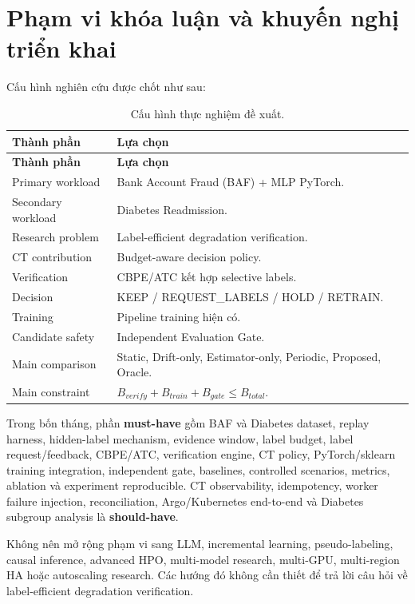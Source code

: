 \section{Phạm vi khóa luận và khuyến nghị triển khai}

Cấu hình nghiên cứu được chốt như sau:

\begin{longtable}{@{}L{4.2cm} L{\dimexpr\linewidth-4.2cm-2\tabcolsep\relax}@{}}
\caption{Cấu hình thực nghiệm đề xuất.}\label{tab:recommended-configuration}\\
\toprule\textbf{Thành phần} & \textbf{Lựa chọn}\\
\midrule\endfirsthead
\toprule\textbf{Thành phần} & \textbf{Lựa chọn}\\
\midrule\endhead
Primary workload & Bank Account Fraud (BAF) + MLP PyTorch.\\
Secondary workload & Diabetes Readmission.\\
Research problem & Label-efficient degradation verification.\\
CT contribution & Budget-aware decision policy.\\
Verification & CBPE/ATC kết hợp selective labels.\\
Decision & KEEP / REQUEST\_LABELS / HOLD / RETRAIN.\\
Training & Pipeline training hiện có.\\
Candidate safety & Independent Evaluation Gate.\\
Main comparison & Static, Drift-only, Estimator-only, Periodic, Proposed, Oracle.\\
Main constraint & \(\mathit{B}_{verify}+\mathit{B}_{train}+\mathit{B}_{gate}\leq\mathit{B}_{total}\).\\
\bottomrule
\end{longtable}

Trong bốn tháng, phần \textbf{must-have} gồm BAF và Diabetes dataset, replay harness, hidden-label mechanism, evidence window, label budget, label request/feedback, CBPE/ATC, verification engine, CT policy, PyTorch/sklearn training integration, independent gate, baselines, controlled scenarios, metrics, ablation và experiment reproducible. CT observability, idempotency, worker failure injection, reconciliation, Argo/Kubernetes end-to-end và Diabetes subgroup analysis là \textbf{should-have}.

Không nên mở rộng phạm vi sang LLM, incremental learning, pseudo-labeling, causal inference, advanced HPO, multi-model research, multi-GPU, multi-region HA hoặc autoscaling research. Các hướng đó không cần thiết để trả lời câu hỏi về label-efficient degradation verification.

